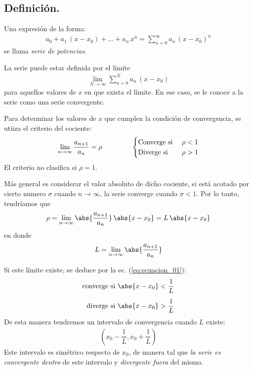 \subsection{Definición.}

Una expresión de la forma:
\begin{align}
a_{0} + a_{1} \, (x - x_{0}) + \ldots + a_{n} \, x^{n} = \sum_{n=0}^{\infty} a_{n} \, (x - x_{0})^{n}
\label{eq:ecuacion_01}    
\end{align}
se llama \textit{serie de potencias}.
\par
La serie puede estar definida por el límite
\begin{align*}
\lim_{N \to \infty} \sum_{n=0}^{N} a_{n} \, (x - x_{0})
\end{align*}
para aquellos valores de $x$ en que exista el límite. En ese caso, se le conoce a la serie como una serie convergente.
\par
Para determinar los valores de $x$ que cumplen la condición de convergencia, se utiiza el criterio del cociente:
\begin{align*}
\lim_{n \to \infty} \dfrac{a_{n+1}}{a_{n}} = \rho \hspace{1.5cm} \begin{cases}
\mbox{Converge si } & \rho < 1 \\
\mbox{Diverge si } & \rho > 1
\end{cases}
\end{align*}
El criterio no clasifica si $\rho = 1$.
\par
Más general es considerar el valor absoluto de dicho cociente, si está acotado por cierto numero $\sigma$ cuando $n \to \infty$, la serie converge cuando $\sigma < 1$. Por lo tanto, tendríamos que
\begin{align*}
\rho = \lim_{n \to \infty} \abs{\dfrac{a_{n+1}}{a_{n}}} \, \abs{x - x_{0}} = L \, \abs{x - x_{0}}
\end{align*}
en donde
\begin{align*}
L = \lim_{n \to \infty} \abs{\dfrac{a_{n+1}}{a_{n}}}
\end{align*}
\par
Si este límite existe, se deduce por la ec. (\ref{eq:ecuacion_01}):
\begin{align}
\begin{aligned}        
\mbox{converge si } &\abs{x - x_{0}} < \dfrac{1}{L} \\[0.5em]
\mbox{diverge si } &\abs{x - x_{0}} > \dfrac{1}{L}
\end{aligned}
\label{eq:ecuacion_02}    
\end{align}
De esta manera tendremos un intervalo de convergencia cuando $L$ existe:
\begin{align*}
\left( x_{0} - \dfrac{1}{L}, x_{0} + \dfrac{1}{L} \right)
\end{align*}
Este intervalo es simétrico respecto de $x_{0}$, de manera tal que \emph{la serie es convergente dentro} de este intervalo y \emph{divergente fuera} del mismo.
